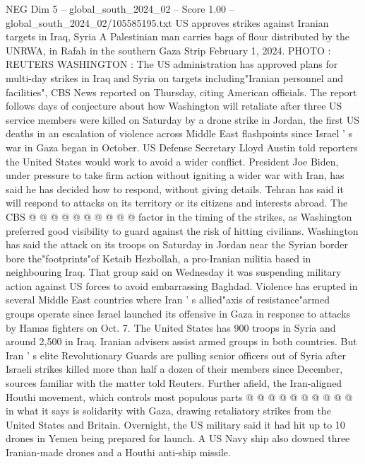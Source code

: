 \begin{textsample}{NEG Dim 5 – global\_south\_2024\_02 – Score 1.00 – global\_south\_2024\_02/105585195.txt}  \label{ex:f5_neg_255}
US approves strikes against Iranian targets in Iraq, Syria A Palestinian man carries bags of flour distributed by the UNRWA, in Rafah in the southern Gaza Strip February 1, 2024.
PHOTO : REUTERS WASHINGTON : The US administration has approved plans for multi-day strikes in Iraq and Syria on targets including"Iranian personnel and facilities", CBS News reported on Thursday, citing American officials.
The report follows days of conjecture about how Washington will retaliate after three US service members were killed on Saturday by a drone strike in Jordan, the first US deaths in an escalation of violence across Middle East flashpoints since Israel ' s war in Gaza began in October.
US Defense Secretary Lloyd Austin told reporters the United States would work to avoid a wider conflict.
President Joe Biden, under pressure to take firm action without igniting a wider war with Iran, has said he has decided how to respond, without giving details.
Tehran has said it will respond to attacks on its territory or its citizens and interests abroad.
The CBS @ @ @ @ @ @ @ @ @ @ factor in the timing of the strikes, as Washington preferred good visibility to guard against the risk of hitting civilians.
Washington has said the attack on its troops on Saturday in Jordan near the Syrian border bore the"footprints"of Ketaib Hezbollah, a pro-Iranian militia based in neighbouring Iraq.
That group said on Wednesday it was suspending military action against US forces to avoid embarrassing Baghdad.
Violence has erupted in several Middle East countries where Iran ' s allied"axis of resistance"armed groups operate since Israel launched its offensive in Gaza in response to attacks by Hamas fighters on Oct. 7.
The United States has 900 troops in Syria and around 2,500 in Iraq.
Iranian advisers assist armed groups in both countries.
But Iran ' s elite Revolutionary Guards are pulling senior officers out of Syria after Israeli strikes killed more than half a dozen of their members since December, sources familiar with the matter told Reuters.
Further afield, the Iran-aligned Houthi movement, which controls most populous parts @ @ @ @ @ @ @ @ @ @ in what it says is solidarity with Gaza, drawing retaliatory strikes from the United States and Britain.
Overnight, the US military said it had hit up to 10 drones in Yemen being prepared for launch.
A US Navy ship also downed three Iranian-made drones and a Houthi anti-ship missile.

\end{textsample}
